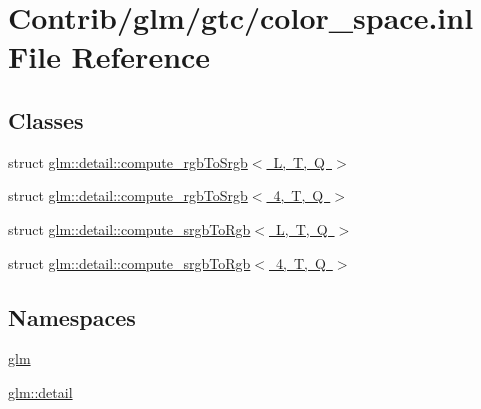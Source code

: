 \hypertarget{gtc_2color__space_8inl}{}\section{Contrib/glm/gtc/color\+\_\+space.inl File Reference}
\label{gtc_2color__space_8inl}
\subsection*{Classes}
\begin{DoxyCompactItemize}
\item 
struct \mbox{\hyperlink{structglm_1_1detail_1_1compute__rgb_to_srgb}{glm\+::detail\+::compute\+\_\+rgb\+To\+Srgb$<$ L, T, Q $>$}}
\item 
struct \mbox{\hyperlink{structglm_1_1detail_1_1compute__rgb_to_srgb_3_014_00_01_t_00_01_q_01_4}{glm\+::detail\+::compute\+\_\+rgb\+To\+Srgb$<$ 4, T, Q $>$}}
\item 
struct \mbox{\hyperlink{structglm_1_1detail_1_1compute__srgb_to_rgb}{glm\+::detail\+::compute\+\_\+srgb\+To\+Rgb$<$ L, T, Q $>$}}
\item 
struct \mbox{\hyperlink{structglm_1_1detail_1_1compute__srgb_to_rgb_3_014_00_01_t_00_01_q_01_4}{glm\+::detail\+::compute\+\_\+srgb\+To\+Rgb$<$ 4, T, Q $>$}}
\end{DoxyCompactItemize}
\subsection*{Namespaces}
\begin{DoxyCompactItemize}
\item 
 \mbox{\hyperlink{namespaceglm}{glm}}
\item 
 \mbox{\hyperlink{namespaceglm_1_1detail}{glm\+::detail}}
\end{DoxyCompactItemize}
